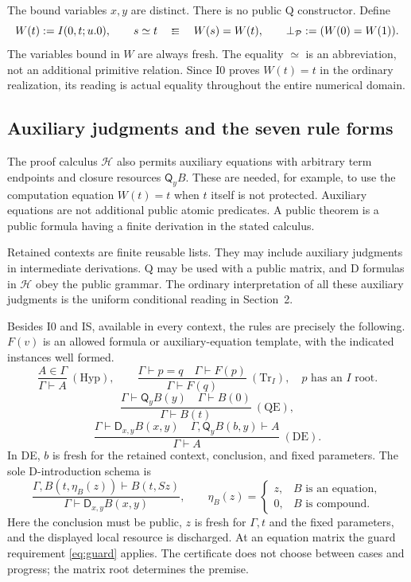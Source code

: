 \documentclass[11pt,letterpaper]{article}
\theoremstyle{definition}\newtheorem{definition}[theorem]{Definition}
\theoremstyle{remark}\newtheorem{remark}[theorem]{Remark}
\newcommand{\D}{\mathsf D}\newcommand{\Q}{\mathsf Q}
\newcommand{\Hcal}{\mathcal H}\newcommand{\Kcal}{\mathcal K}
\begin{document}
The bound variables \(x,y\) are distinct. There is no public Q
constructor. Define
\[
 W(t):=I(0,t;u.0),\qquad
 s\simeq t\quad:\!\!\equiv\quad W(s)=W(t),\qquad
 \bot_{\mathcal P}:=(W(0)=W(1)).
\]
The variables bound in \(W\) are always fresh. The equality
\(\simeq\) is an abbreviation, not an additional primitive relation.
Since I0 proves \(W(t)=t\) in the ordinary realization, its reading
is actual equality throughout the entire numerical domain.

\subsection{Auxiliary judgments and the seven rule forms}

The proof calculus \(\Hcal\) also permits auxiliary equations with
arbitrary term endpoints and closure resources \(\Q_yB\). These are
needed, for example, to use the computation equation \(W(t)=t\)
when \(t\) itself is not protected. Auxiliary equations are not
additional public atomic predicates. A public theorem is a public
formula having a finite derivation in the stated calculus.

Retained contexts are finite reusable lists. They may include auxiliary
judgments in intermediate derivations. Q may be used with a public
matrix, and D formulas in \(\Hcal\) obey the public grammar. The
ordinary interpretation of all these auxiliary judgments is the
uniform conditional reading in Section~2.

Besides I0 and IS, available in every context, the rules are precisely
the following. \(F(v)\) is an allowed formula or auxiliary-equation
template, with the indicated instances well formed.
\[
 \frac{A\in\Gamma}{\Gamma\vdash A}\ (\mathrm{Hyp}),\qquad
 \frac{\Gamma\vdash p=q\quad\Gamma\vdash F(p)}
      {\Gamma\vdash F(q)}\ (\mathrm{Tr}_{I}),
 \quad p\text{ has an }I\text{ root}.
 \tag{H,Tr}\label{eq:tr}
\]
\[
 \frac{\Gamma\vdash\Q_yB(y)\quad\Gamma\vdash B(0)}
      {\Gamma\vdash B(t)}\ (\mathrm{QE}),
\]
\[
 \frac{\Gamma\vdash\D_{x,y}B(x,y)\quad
       \Gamma,\Q_yB(b,y)\vdash A}
      {\Gamma\vdash A}\ (\mathrm{DE}).
\]
In DE, \(b\) is fresh for the retained context, conclusion, and fixed
parameters. The sole D-introduction schema is
\[
 \frac{\Gamma,B(t,\eta_B(z))\vdash B(t,Sz)}
      {\Gamma\vdash\D_{x,y}B(x,y)},\qquad
 \eta_B(z)=
 \begin{cases}
 z,&B\text{ is an equation},\\
 0,&B\text{ is compound}.
 \end{cases}
 \tag{DI}\label{eq:di}
\]
Here the conclusion must be public, \(z\) is fresh for \(\Gamma,t\)
and the fixed parameters, and the displayed local resource is
discharged. At an equation matrix the guard requirement
\eqref{eq:guard} applies. The certificate does not choose between
cases and progress; the matrix root determines the premise.
\end{document}
